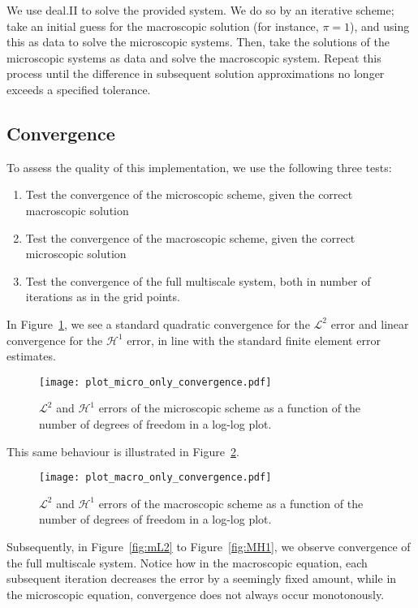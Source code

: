 \documentclass{article}
\renewcommand{\L}{\mathcal{ L}}
\renewcommand{\H}{\mathcal{ H}}
\begin{document}
We use deal.II to solve the provided system. We do so by an iterative scheme; take an initial guess for the macroscopic solution (for instance, $\pi=1$), and using this as data to solve the microscopic systems.
Then, take the solutions of the microscopic systems as data and solve the macroscopic system.
Repeat this process until the difference in subsequent solution approximations no longer exceeds a specified tolerance.

\subsection{Convergence}
To assess the quality of this implementation, we use the following three tests:
\begin{enumerate}
    \item Test the convergence of the microscopic scheme, given the correct macroscopic solution
    \item Test the convergence of the macroscopic scheme, given the correct microscopic solution
    \item Test the convergence of the full multiscale system, both in number of iterations as in the grid points.
\end{enumerate}

In Figure~\ref{fig:micro_convergence}, we see a standard quadratic convergence for the $\L^2$ error and linear convergence for the $\H^1$ error, in line with the standard finite element error estimates.

\begin{figure}[ht]
    \centering
    \texttt{[image: plot\_micro\_only\_convergence.pdf]}
    \caption{$\L^2$ and $\H^1$ errors of the microscopic scheme as a function of the number of degrees of freedom in a log-log plot.}
    \label{fig:micro_convergence}
\end{figure}

This same behaviour is illustrated in Figure~\ref{fig:macro_convergence}.

\begin{figure}[ht]
    \centering
    \texttt{[image: plot\_macro\_only\_convergence.pdf]}
    \caption{$\L^2$ and $\H^1$ errors of the macroscopic scheme as a function of the number of degrees of freedom in a log-log plot.}
    \label{fig:macro_convergence}
\end{figure}

Subsequently, in Figure~\ref{fig:mL2} to Figure~\ref{fig:MH1}, we observe convergence of the full multiscale system.
Notice how in the macroscopic equation, each subsequent iteration decreases the error by a seemingly fixed amount, while in the microscopic equation, convergence does not always occur monotonously.
\end{document}
